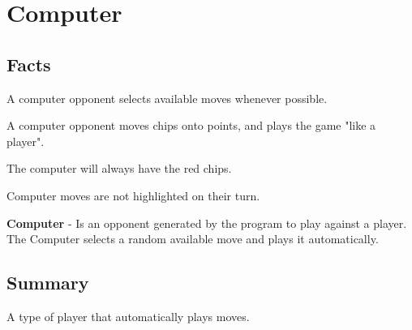 \section{Computer}

\subsection{Facts}

\begin{dashed}
    \item A computer opponent selects available moves whenever possible.
    \item A computer opponent moves chips onto points, and plays
        the game "like a player".
    \item The computer will always have the red chips.
    \item Computer moves are not highlighted on their turn.
\end{dashed}

\noindent
\newline\textbf{Computer} - Is an opponent generated by the program to play against a player. The Computer selects a random available move and plays it automatically.

\subsection{Summary}
A type of player that automatically plays moves.


